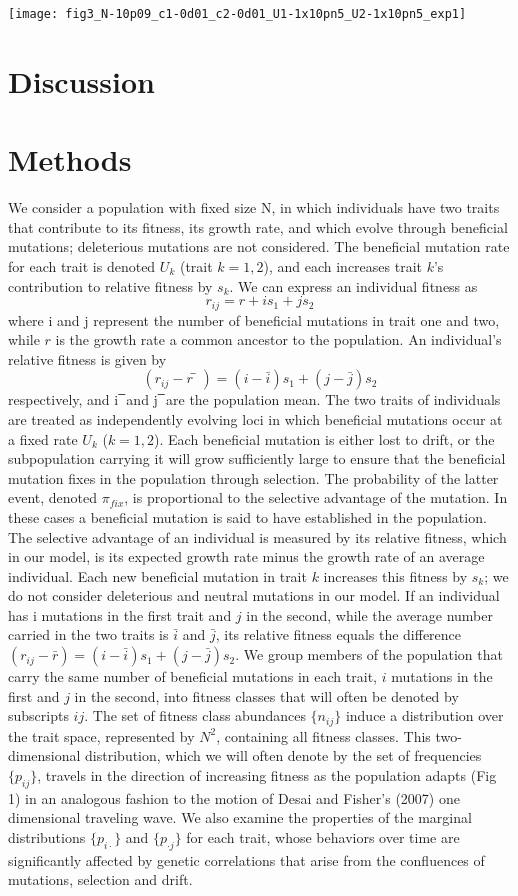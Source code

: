 \documentclass[11pt,one column]{article}
\begin{document}
\begin{multicols}{2}
{\centering
\texttt{[image: fig3\_N-10p09\_c1-0d01\_c2-0d01\_U1-1x10pn5\_U2-1x10pn5\_exp1]}
\label{fig.2}}

\section*{Discussion}
\section*{Methods}
We consider a population with fixed size N, in which individuals have two traits that contribute to its fitness, its growth rate, and which evolve through beneficial mutations; deleterious mutations are not considered.  The beneficial mutation rate for each trait is denoted $U_k$ (trait $k=1,2$), and each increases trait $k$’s contribution to relative fitness by $s_k$.  We can express an individual fitness as 
\[ r_{ij}=r+i s_1+j s_2 \]
where i and j represent the number of beneficial mutations in trait one and two, while $r$ is the growth rate a common ancestor to the population. 
An individual’s relative fitness is given by
\[ (r_{ij}-r ̅)=(i-\bar{i} ) s_1+(j-\bar{j} ) s_2 \]
respectively, and i ̅ and j ̅ are the population mean.  The two traits of individuals are treated as independently evolving loci in which beneficial mutations occur at a fixed rate $U_k$ ($k=1,2$).  Each beneficial mutation is either lost to drift, or the subpopulation carrying it will grow sufficiently large to ensure that the beneficial mutation fixes in the population through selection. The probability of the latter event, denoted $\pi_{fix}$, is proportional to the selective advantage of the mutation. In these cases a beneficial mutation is said to have established in the population. The selective advantage of an individual is measured by its relative fitness, which in our model, is its expected growth rate minus the growth rate of an average individual. Each new beneficial mutation in trait $k$ increases this fitness by $s_k$; we do not consider deleterious and neutral mutations in our model. If an individual has i mutations in the first trait and $j$ in the second, while the average number carried in the two traits is $\bar{i}$ and $\bar{j}$, its relative fitness equals the difference $(r_{ij}-\bar{r})=(i-\bar{i}) s_1+(j-\bar{j}) s_2$. We group members of the population that carry the same number of beneficial mutations in each trait, $i$ mutations in the first and $j$ in the second, into fitness classes that will often be denoted by subscripts $ij$. The set of fitness class abundances $\{n_{ij} \}$ induce a distribution over the trait space, represented by $N^2$, containing all fitness classes. This two-dimensional distribution, which we will often denote by the set of frequencies $\{p_{ij}\}$, travels in the direction of increasing fitness as the population adapts (Fig 1) in an analogous fashion to the motion of Desai and Fisher’s (2007) one dimensional traveling wave. We also examine the properties of the marginal distributions $\{p_{i\cdot}\}$ and $\{p_{\cdot j}\}$ for each trait, whose behaviors over time are significantly affected by genetic correlations that arise from the confluences of mutations, selection and drift.

\end{multicols}
\end{document}
